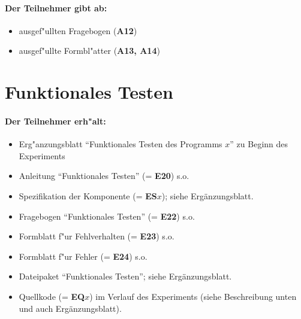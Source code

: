 \paragraph{Der Teilnehmer gibt ab:}  
\begin{itemize}
	\item ausgef"ullten Fragebogen ({\bf A12})
	\item ausgef"ullte Formbl"atter  ({\bf A13, A14})
\end{itemize}

\newpage
\section*{Funktionales Testen}

\paragraph{Der Teilnehmer erh"alt:}  
\begin{itemize}
	\item Erg"anzungsblatt "`Funktionales Testen des Programms $x$"' zu Beginn 
		des Experiments
	\item Anleitung "`Funktionales Testen"' (= {\bf E20}) s.o.
	\item Spezifikation der Komponente (= {\bf ES$x$});
		siehe Erg\"anzungsblatt.
	\item Fragebogen "`Funktionales Testen"' (= {\bf E22}) s.o.
	\item Formblatt f"ur Fehlverhalten (= {\bf E23}) s.o.
	\item Formblatt f"ur Fehler (= {\bf E24}) s.o.
	\item Dateipaket "`Funktionales Testen"'; siehe Erg\"anzungsblatt.
	\item Quellkode (= {\bf EQ$x$}) im Verlauf des Experiments
		(siehe Beschreibung unten und auch Erg\"anzungsblatt).
\end{itemize}

